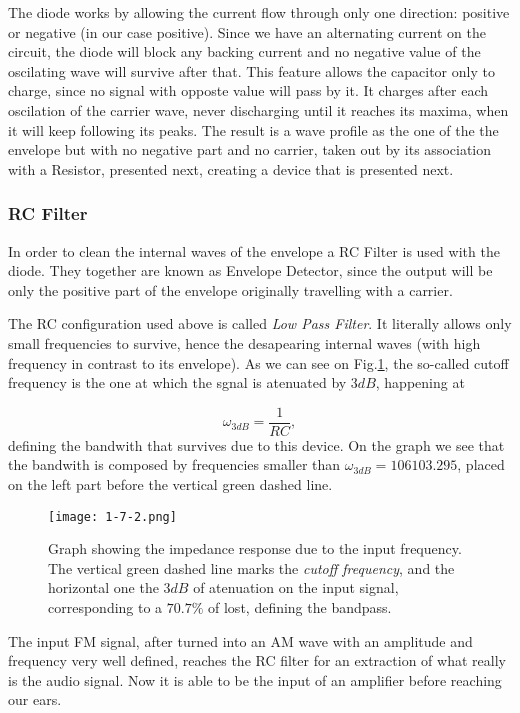 \documentclass{article}
\begin{document}
The diode works by allowing the current flow through only one direction:
positive or negative (in our case positive). Since we have an alternating current on the circuit,
the diode will block any backing current and no negative value of the
oscilating wave will survive after that. This feature allows the capacitor only to charge, since no
signal with opposte value will pass by it. It charges after each oscilation of the carrier wave, 
never discharging until it reaches its maxima, when it will keep following its peaks. 
The result is a wave profile as
the one of the the envelope but with no negative part and no carrier,
taken out by its association with a Resistor, presented
next, creating a device that is presented next. 

\subsubsection{RC Filter}

In order to clean the internal waves of the envelope a RC Filter is
used with the diode. They together are known as Envelope
Detector, since the output will be only the positive part of the
envelope originally travelling with a carrier. 

The RC configuration used above is called \emph{Low Pass Filter}. It
literally allows only small frequencies to survive, hence the
desapearing internal waves (with high frequency in contrast to its
envelope). As we can see on Fig.\ref{lastfilter}, the so-called cutoff
frequency is the one at which the sgnal is atenuated by $3dB$, happening
at 

\begin{equation}
\omega_{3dB}=\frac{1}{RC},
\label{eq:1}
\end{equation}
defining the bandwith that survives due to this device. On the graph we
see that the bandwith is composed by frequencies smaller than
$\omega_{3dB}=106103.295$, placed on the left part before the vertical
green dashed line.

\begin{figure}[H]
\center
\texttt{[image: 1-7-2.png]}
\caption {Graph showing the impedance response due to the input
  frequency. The vertical green dashed line marks the \emph{cutoff
   frequency}, and the horizontal one the $3dB$ of atenuation on the
 input signal, corresponding to a $70.7\%$ of lost, defining the bandpass.}
\label{lastfilter}
\end{figure}

The input FM signal, after turned into an AM wave with an amplitude and
frequency very well defined, reaches the RC filter for an extraction of
what really is the audio signal. Now it is able to be the input of an
amplifier before reaching our ears. 
\end{document}
